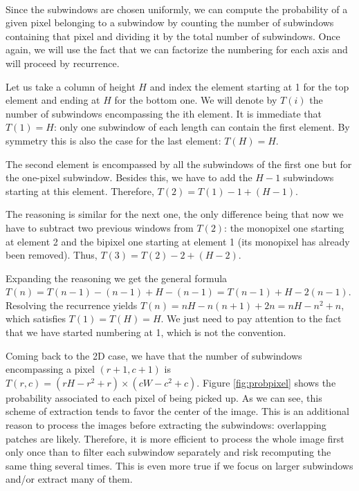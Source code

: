 \documentclass[a4paper]{report}
\newlength{\larg}
\begin{document}
		\paragraph{}
		Since the subwindows are chosen uniformly, we can compute the probability of a given pixel belonging to a subwindow by counting the number of subwindows containing that pixel and dividing it by the total number of subwindows. Once again, we will use the fact that we can factorize the numbering for each axis and will proceed by recurrence. 
		\par
		Let us take a column of height $H$ and index the element starting at 1 for the top element and ending at $H$ for the bottom one. We will denote by $T(i)$ the number of subwindows encompassing the ith element. It is immediate that $T(1) = H$: only one subwindow of each length can contain the first element. By symmetry this is also the case for the last element: $T(H) = H$. 
		\par
		The second element is encompassed by all the subwindows of the first one but for the one-pixel subwindow. Besides this, we have to add the $H-1$ subwindows starting at this element. Therefore, $T(2) = T(1) - 1 + (H -1)$. 
		\par
		The reasoning is similar for the next one, the only difference being that now we have to subtract two previous windows from $T(2)$: the monopixel one starting at element 2 and the bipixel one starting at element 1 (its monopixel has already been removed). Thus, $T(3) = T(2) - 2 + (H - 2)$. 
		\par
		Expanding the reasoning we get the general formula $T(n) = T(n-1) - (n-1) + H - (n-1) = T(n-1) + H - 2(n-1)$. Resolving the recurrence yields $T(n) = nH - n(n+1) + 2n = nH -n^2 + n$, which satisfies $T(1) = T(H) = H$. We just need to pay attention to the fact that we have started numbering at 1, which is not the convention.
		\par
		Coming back to the 2D case, we have that the number of subwindows encompassing a pixel $(r+1,c+1)$ is $T(r,c) = (rH - r^2 + r) \times (cW - c^2 + c)$.
		Figure \ref{fig:probpixel} shows the probability associated to each pixel of being picked up. As we can see, this scheme of extraction tends to favor the center of the image. This is an additional reason to process the images before extracting the subwindows: overlapping patches are likely. Therefore, it is more efficient to process the whole image first only once than to filter each subwindow separately and risk recomputing the same thing several times. This is even more true if we focus on larger subwindows and/or extract many of them.
		
\end{document}
